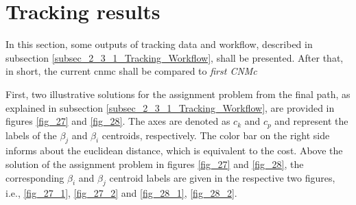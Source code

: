 \section{Tracking results}
\label{sec_3_1_Tracking_Results}
In this section, some outputs of tracking data and workflow, described in subsection \ref{subsec_2_3_1_Tracking_Workflow}, shall be presented. 
After that, in short, the current \gls{cnmc} shall be compared to \emph{first CNMc} \newline

First, two illustrative solutions for the assignment problem from the final path, as explained in subsection \ref{subsec_2_3_1_Tracking_Workflow}, are provided in figures \ref{fig_27} and \ref{fig_28}. 
The axes are denoted as $c_k$ and $c_p$ and represent the labels of the $\beta_j$ and $\beta_i$ centroids, respectively.
The color bar on the right side informs about the euclidean distance, which is equivalent to the cost.
Above the solution of the assignment problem in figures \ref{fig_27} and \ref{fig_28}, the corresponding $\beta_i$ and $\beta_j$ centroid labels are given in the respective two figures, i.e., \ref{fig_27_1}, \ref{fig_27_2} and \ref{fig_28_1}, \ref{fig_28_2}.


